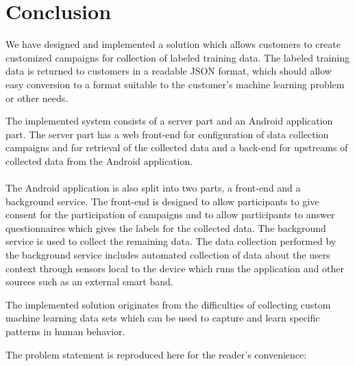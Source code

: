 
\chapter{Conclusion}
\label{cha:conclusion}

We have designed and implemented a solution which allows customers to create customized campaigns for collection of labeled training data. The labeled training data is returned to customers in a readable JSON format, which should allow easy conversion to a format suitable to the customer's machine learning problem or other needs. 

The implemented system consists of a server part and an Android application part. The server part has a web front-end for configuration of data collection campaigns and for retrieval of the collected data and a back-end for upstreams of collected data from the Android application. 
\\\\
The Android application is also split into two parts, a front-end and a background service. The front-end is designed to allow participants to give consent for the participation of campaigns and to allow participants to answer questionnaires which gives the labels for the collected data. The background service is used to collect the remaining data. The data collection performed by the background service includes automated collection of data about the users context through sensors local to the device which runs the application and other sources such as an external smart band. 


The implemented solution originates from the difficulties of collecting custom machine learning data sets which can be used to capture and learn specific patterns in human behavior.  

The problem statement is reproduced here for the reader's convenience:
\\\\




